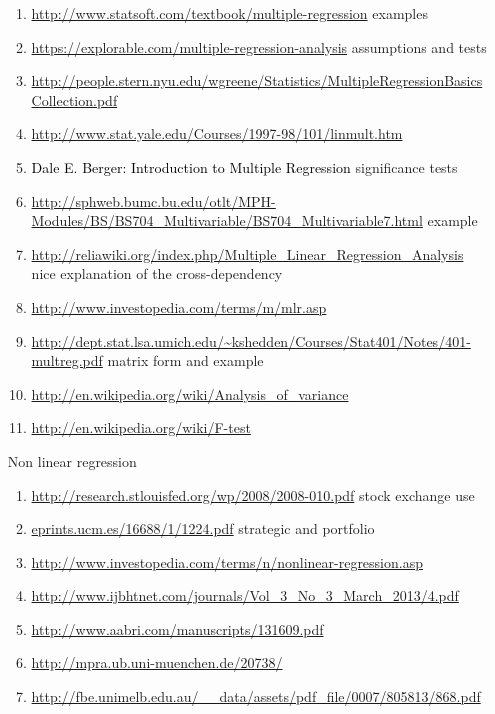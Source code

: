 \documentclass{article}
\begin{document}
\begin{enumerate}
\begin{enumerate}
			\item \textcolor{red}{\url{http://www.statsoft.com/textbook/multiple-regression}} examples
			\item \textcolor{red}{\url{https://explorable.com/multiple-regression-analysis}} assumptions and tests
			\item \textcolor{black}{\url{http://people.stern.nyu.edu/wgreene/Statistics/MultipleRegressionBasicsCollection.pdf}}
			\item \textcolor{blue}{\url{http://www.stat.yale.edu/Courses/1997-98/101/linmult.htm}}
			\item \textcolor{black}{Dale E. Berger: Introduction to Multiple Regression} significance tests
			\item \textcolor{blue}{\url{http://sphweb.bumc.bu.edu/otlt/MPH-Modules/BS/BS704_Multivariable/BS704_Multivariable7.html}} example
			\item \textcolor{red}{\url{http://reliawiki.org/index.php/Multiple_Linear_Regression_Analysis}} nice explanation of the cross-dependency
			\item \textcolor{blue}{\url{http://www.investopedia.com/terms/m/mlr.asp}}
			\item \textcolor{black}{\url{http://dept.stat.lsa.umich.edu/~kshedden/Courses/Stat401/Notes/401-multreg.pdf}} matrix form and example
			\item \textcolor{black}{\url{http://en.wikipedia.org/wiki/Analysis_of_variance}}
			\item \textcolor{black}{\url{http://en.wikipedia.org/wiki/F-test}}
		\end{enumerate} 
	\item[Non linear regression]
		\begin{enumerate}
			\item \textcolor{black}{\url{http://research.stlouisfed.org/wp/2008/2008-010.pdf}} stock exchange use
			\item \textcolor{black}{\url{eprints.ucm.es/16688/1/1224.pdf}} strategic and portfolio
			\item \textcolor{blue}{\url{http://www.investopedia.com/terms/n/nonlinear-regression.asp}}
			\item \textcolor{black}{\url{http://www.ijbhtnet.com/journals/Vol_3_No_3_March_2013/4.pdf}}
			\item \textcolor{black}{\url{http://www.aabri.com/manuscripts/131609.pdf}}
			\item \textcolor{black}{\url{http://mpra.ub.uni-muenchen.de/20738/ }}
			\item \textcolor{black}{\url{http://fbe.unimelb.edu.au/__data/assets/pdf_file/0007/805813/868.pdf}}

\end{enumerate}
\end{enumerate}
\end{document}
